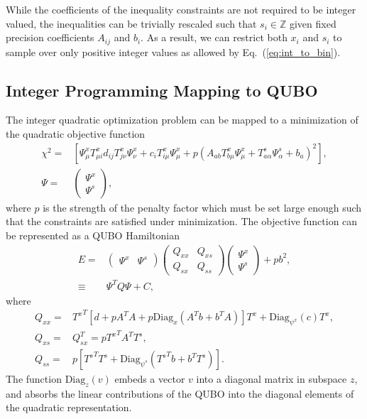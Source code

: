 \documentclass[fleqn,10pt]{wlscirep}
\begin{document}
While the coefficients of the inequality constraints are not required to be integer valued, the inequalities can be trivially rescaled such that $s_i \in \mathbb{Z}$ given fixed precision coefficients $A_{ij}$ and $b_i$. As a result, we can restrict both $x_i$ and $s_i$ to sample over only positive integer values as allowed by Eq.~(\ref{eq:int_to_bin}).

\subsection{Integer Programming Mapping to QUBO}
\label{sec:results:ilp}
The integer quadratic optimization problem can be mapped to a minimization of the quadratic objective function
\begin{align}
\chi^2 = & \left[\Psi^x_{\mu} T^x_{\mu i}d_{ij} T^x_{j \nu}\Psi^x_\nu + c_i T^x_{i\mu} \Psi^x_\mu + p (A_{a b} T^x_{b \mu} \Psi^x_{\mu} + T^s_{a \alpha} \Psi^s_\alpha + b_a)^2 \right],\\
\Psi = & \begin{pmatrix}
\Psi^x\\
\Psi^s
\end{pmatrix},
\end{align}
where $p$ is the strength of the penalty factor which must be set large enough such that the constraints are satisfied under minimization. The objective function can be represented as a QUBO Hamiltonian
\begin{align}
E = &
\begin{pmatrix}
\Psi^x & \Psi^s
\end{pmatrix}
\begin{pmatrix}
Q_{xx} & Q_{xs}\\
Q_{sx} & Q_{ss} 
\end{pmatrix}
\begin{pmatrix}
\Psi^x\\ \Psi^s
\end{pmatrix} + pb^2,\\
\equiv & \Psi^T Q \Psi + C,
\label{eq:matrix_form}
\end{align}
where
\begin{align}
Q_{xx} = & {T^{x}}^T \left[ d + p A^T A + p \mathrm{Diag}_{x} \left(A^T b + b^T A\right) \right] T^x + \mathrm{Diag}_{\psi^x}(c) T^x,\\
Q_{xs} = & Q_{sx}^T = p {T^{x}}^T A^T T^s,\\
Q_{ss} = & p\left[ {T^{s}}^T T^s + \mathrm{Diag}_{\psi^s}\left( {T^{s}}^T b + b^T T^s\right) \right].
\end{align}
The function $\mathrm{Diag}_{z}(v)$ embeds a vector $v$ into a diagonal matrix in subspace $z$, and absorbs the linear contributions of the QUBO into the diagonal elements of the quadratic representation.
\end{document}

